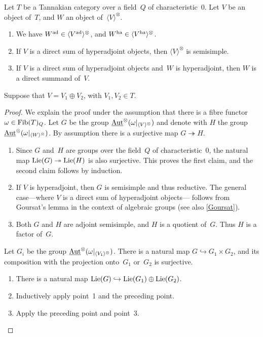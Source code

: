 \documentclass[10pt,twoside,leqno]{article}
\numberwithin{equation}{subsection}
\newcommand{\into}{\hookrightarrow}
\newcommand{\onto}{\twoheadrightarrow}
\newcommand{\Aut}{\textnormal{Aut}}
\newcommand{\iAut}{\underline{\Aut}}
\newcommand{\ZZ}{\mathbb{Z}}
\newcommand{\Lie}{\textnormal{Lie}}
\newcommand{\ad}{\textnormal{ad}}
\newcommand{\ha}{\textnormal{ha}}
\newcommand{\Fib}{\textnormal{Fib}}
\newcommand{\Tangen}[1]{\langle #1 \rangle^{\otimes}}
\begin{document}
\begin{lemma} %
 \label{ha-props}
 Let $T$ be a Tannakian category over a field~$Q$ of characteristic~$0$.
 Let $V$ be an object of~$T$, and $W$ an object of~$\Tangen{V}$.
 \begin{enumerate}
  \item We have $W^\ad \in \Tangen{V^\ad}$, and $W^\ha \in \Tangen{V^\ha}$.
  \item If $V$ is a direct sum of hyperadjoint objects,
   then $\Tangen{V}$ is semisimple.
  \item If $V$ is a direct sum of hyperadjoint objects
   and~$W$ is hyperadjoint, then $W$ is a direct summand of~$V$.
 \end{enumerate}
  Suppose that $V = V_1 \oplus V_2$, with $V_1,V_2 \in T$.
 \begin{proof}
  We explain the proof under the assumption
  that there is a fibre functor $\omega \in \Fib(T)_Q$.
  Let $G$ be the group $\iAut^\otimes(\omega|_{\Tangen{V}})$
  and denote with $H$ the group $\iAut^\otimes(\omega|_{\Tangen{W}})$.
  By assumption there is a surjective map $G \onto H$.
  \begin{enumerate}
   \item Since $G$ and~$H$ are groups over the field~$Q$ of characteristic~$0$,
    the natural map $\Lie(G) \onto \Lie(H)$ is also surjective.
    This proves the first claim, and the second claim follows by induction.
   \item If $V$ is hyperadjoint, then $G$ is semisimple and thus reductive.
    The general case---where $V$ is a direct sum of hyperadjoint objects---%
    follows from Goursat's lemma in the context of algebraic groups
    (see also \cref{Goursat}).
   \item Both $G$ and $H$ are adjoint semisimple, and $H$ is a quotient of~$G$.
    Thus $H$ is a factor of~$G$.
  \end{enumerate}
  Let $G_i$ be the group $\iAut^\otimes(\omega|_{\Tangen{V_1}})$.
  There is a natural map $G \into G_1 \times G_2$,
  and its composition with the projection onto~$G_1$ or~$G_2$ is surjective.
  \begin{enumerate}[resume]
   \item There is a natural map $\Lie(G) \into \Lie(G_1) \oplus \Lie(G_2)$.
   \item Inductively apply point~1 and the preceding point.
   \item Apply the preceding point and point~3.
  \end{enumerate}
 \end{proof}
\end{lemma}
\end{document}
